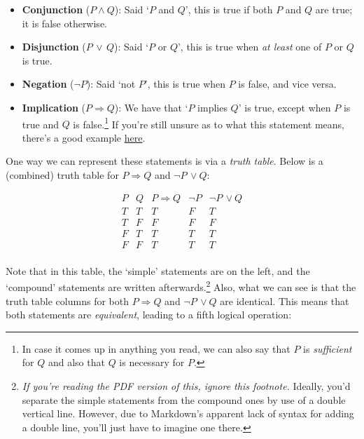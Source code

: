 \documentclass[
  12pt,
  a4paper]{extarticle}
\providecommand{\tightlist}{%
  \setlength{\itemsep}{0pt}\setlength{\parskip}{0pt}}
\theoremstyle{plain}
\theoremstyle{definition}
\theoremstyle{plain}
\theoremstyle{plain}
\theoremstyle{plain}
\theoremstyle{plain}
\theoremstyle{definition}
\theoremstyle{definition}
\newtheorem*{Order Axioms*}{Order Axioms}\newtheorem{Order Axioms}{Order Axioms}[section]
\theoremstyle{remark}
\theoremstyle{remark}
\renewcommand{\;}{\,}
\begin{document}
\begin{itemize}
\tightlist
\item
  \textbf{Conjunction} (\(P \wedge Q\)): Said `\(P\) and \(Q\)', this is true if both \(P\) and \(Q\) are true; it is false otherwise.
\item
  \textbf{Disjunction} (\(P \;\vee\; Q\)): Said `\(P\) or \(Q\)', this is true when \emph{at least} one of \(P\) or \(Q\) is true.
\item
  \textbf{Negation} (\(\neg P\)): Said `not \(P\)', this is true when \(P\) is false, and vice versa.
\item
  \textbf{Implication} (\(P\Rightarrow Q\)): We have that `\(P\) implies \(Q\)' is true, except when \(P\) is true and \(Q\) is false.\footnote{In case it comes up in anything you read, we can also say that \(P\) is \emph{sufficient} for \(Q\) and also that \(Q\) is necessary for \(P\).} If you're still unsure as to what this statement means, there's a good example \href{https://simple.wikipedia.org/wiki/Implication_(logic)}{here}.
\end{itemize}

One way we can represent these statements is via a \emph{truth table}. Below is a (combined) truth table for \(P \Rightarrow Q\) and \(\neg P \;\vee Q\):

\begin{equation*}
        \begin{array}{c|c||c|c|c}
            P & Q & P \Rightarrow Q & \neg P & \neg P \; \vee Q  \\
            \hline
            T & T & T & F & T \\
            T & F & F  & F & F \\
            F & T & T  & T & T \\
            F & F & T  & T & T \\
        \end{array}
\end{equation*}

Note that in this table, the `simple' statements are on the left, and the `compound' statements are written afterwards.\footnote{\emph{If you're reading the PDF version of this, ignore this footnote.} Ideally, you'd separate the simple statements from the compound ones by use of a double vertical line. However, due to Markdown's apparent lack of syntax for adding a double line, you'll just have to imagine one there.} Also, what we can see is that the truth table columns for both \(P \Rightarrow Q\) and \(\neg P \;\vee Q\) are identical. This means that both statements are \emph{equivalent}, leading to a fifth logical operation:
\end{document}
